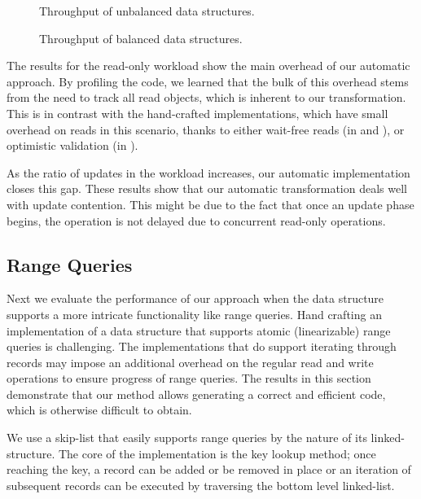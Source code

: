 \begin{figure*}
\begin{center}

\end{center}
\caption{Throughput of unbalanced data structures.}
\label{evaluation:results:unbalanced}
\end{figure*}


\begin{figure*}
\begin{center}

\end{center}
\caption{Throughput of balanced data
structures.}
\label{evaluation:results:balanced}
\end{figure*}

The results for the read-only workload show the main overhead
of our automatic approach. By profiling the code, we learned 
that the bulk of this overhead stems from the need to track all read objects,
which is inherent to our transformation. 
This is in contrast with the hand-crafted implementations,
which have small overhead on reads in this scenario, thanks to either 
wait-free reads (in \danaTree and \danaAVL), or optimistic validation (in \bronson). 
 
As the ratio of updates in the workload increases, our automatic implementation 
closes this gap.
These results show that our automatic transformation deals well with update contention. 
This might be due to the fact that once
an update phase begins, the operation is not delayed due to concurrent 
read-only operations. 


\subsection{Range Queries}
\label{sec:range} 

Next we evaluate the performance of our approach when the data
structure supports a more intricate functionality like range queries. Hand
crafting an implementation of a data structure that supports atomic
(linearizable) range queries is challenging.
The implementations that do support iterating through records may impose an
additional overhead on the regular read and write operations to ensure
progress of range queries.
The results in this section demonstrate that our method
allows generating a correct and efficient code, which is otherwise difficult
to obtain.

We use a skip-list that easily supports range queries by the
nature of its linked-structure. The core of the implementation is the key lookup
method; once reaching the key, a record can be added or be removed in place or
an iteration of subsequent records can be executed by traversing
the bottom level linked-list.

